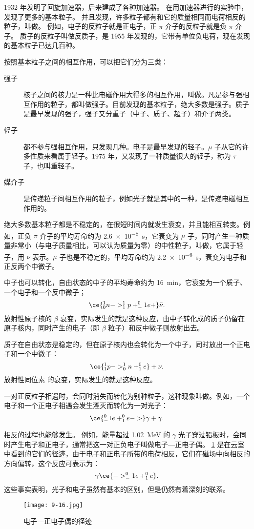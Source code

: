 1932 年发明了回旋加速器，后来建成了各种加速器。
在用加速器进行的实验中，发现了更多的基本粒子。
并且发现，许多粒子都有和它的质量相同而电荷相反的粒子，叫做。
例如，电子的反粒子就是正电子，正 $\pi$ 介子的反粒子就是负 $\pi$ 介子。
质子的反粒子叫做反质子，是 1955 年发现的，它带有单位负电荷，现在发现的基本粒子已达几百种。

按照基本粒子之间的相互作用，可以把它们分为三类：

\begin{description}
  \item[强子] 核子之间的核力是一种比电磁作用大得多的相互作用，叫做。凡是参与强相互作用的粒子，都叫做强子。目前发现的基本粒子，绝大多数是强子。质子是最早发现的强子，强子又分重子（中子、质子、超子）和介子两类。
  \item[轻子] 都不参与强相互作用，只发现几种。电子是最早发现的轻子。$\mu$ 子从它的许多性质来看属于轻子。1975 年，又发现了一种质量很大的轻子，称为 $\tau$ 子，也叫重轻子。
  \item[媒介子] 是传递粒子间相互作用的粒子，例如光子就是其中的一种，是传递电磁相互作用的。
\end{description}

\bigskip
绝大多数基本粒子都是不稳定的，在很短时间内就发生衰变，并且能相互转变。例如，正负 $\pi$ 介子的平均寿命约为 \qty{2.6e-8}{s}，它衰变为 $\mu$ 子，同时产生一种质量非常小（与电子质量相比，可以认为质量为零）的中性粒子，叫做，它属于轻子，用 $\nu$ 表示。$\mu$ 子也是不稳定的，平均寿命约为 \qty{2.2e-6}{s}，衰变为电子和正反两个中微子。

中子也可以转化，自由状态的中子的平均寿命约为 \qty{16}{min}，它衰变为一个质子、一个电子和一个反中微子；
\[ \ce { ^1_0n -> ^1_1p + ^0_-1e + } \bar{\nu}.\]
放射性原子核的 $\beta$ 衰变，实际发生的就是这种反应，由中子转化成的质子仍留在原子核内，同时产生的电子（即 $\beta$ 粒子）和反中微子则放射出去。

质子在自由状态是稳定的，但在原子核内也会转化为一个中子，同时放出一个正电子和一个中微子：
\[\ce{ ^1_1p -> ^1_0n + ^0_1e }+ \nu.\]
放射性同位素  的衰变，实际发生的就是这种反应。

一对正反粒子相遇时，会同时消失而转化为别种粒子，这种现象叫做。例如，一个电子和一个正电子相遇会发生湮灭而转化为一对光子：
\[ \ce{ ^0_-1e +^0_1e -> } \gamma + \gamma .\]

相反的过程也能够发生。
例如，能量超过 \qty{1.02}{MeV} 的 $\gamma$ 光子穿过铅板时，会同时产生电子和正电子，通常把这一对正负电子叫做电子—正电子偶。
\cref{fig:9-16} 是在云室中看到的它们的径迹，由于电子和正电子所带的电荷相反，它们在磁场中向相反的方向偏转，这个反应可表示为：
\[ \gamma \ce{ -> ^0_-1e +^0_1e }.\]
这些事实表明，光子和电子虽然有基本的区别，但是仍然有着深刻的联系。
\begin{figure}
  \texttt{[image: 9-16.jpg]}
  \caption{电子—正电子偶的径迹}\label{fig:9-16}
\end{figure}

